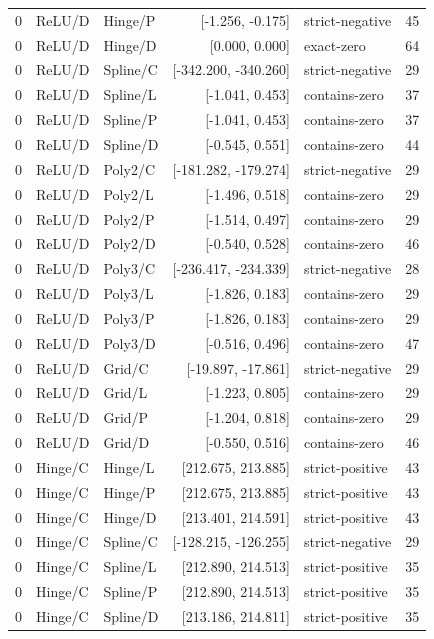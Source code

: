 \begin{longtable}{lllrlr}
0 & ReLU/D & Hinge/P & [-1.256, -0.175] & strict-negative & 45 \\
0 & ReLU/D & Hinge/D & [0.000, 0.000] & exact-zero & 64 \\
0 & ReLU/D & Spline/C & [-342.200, -340.260] & strict-negative & 29 \\
0 & ReLU/D & Spline/L & [-1.041, 0.453] & contains-zero & 37 \\
0 & ReLU/D & Spline/P & [-1.041, 0.453] & contains-zero & 37 \\
0 & ReLU/D & Spline/D & [-0.545, 0.551] & contains-zero & 44 \\
0 & ReLU/D & Poly2/C & [-181.282, -179.274] & strict-negative & 29 \\
0 & ReLU/D & Poly2/L & [-1.496, 0.518] & contains-zero & 29 \\
0 & ReLU/D & Poly2/P & [-1.514, 0.497] & contains-zero & 29 \\
0 & ReLU/D & Poly2/D & [-0.540, 0.528] & contains-zero & 46 \\
0 & ReLU/D & Poly3/C & [-236.417, -234.339] & strict-negative & 28 \\
0 & ReLU/D & Poly3/L & [-1.826, 0.183] & contains-zero & 29 \\
0 & ReLU/D & Poly3/P & [-1.826, 0.183] & contains-zero & 29 \\
0 & ReLU/D & Poly3/D & [-0.516, 0.496] & contains-zero & 47 \\
0 & ReLU/D & Grid/C & [-19.897, -17.861] & strict-negative & 29 \\
0 & ReLU/D & Grid/L & [-1.223, 0.805] & contains-zero & 29 \\
0 & ReLU/D & Grid/P & [-1.204, 0.818] & contains-zero & 29 \\
0 & ReLU/D & Grid/D & [-0.550, 0.516] & contains-zero & 46 \\
0 & Hinge/C & Hinge/L & [212.675, 213.885] & strict-positive & 43 \\
0 & Hinge/C & Hinge/P & [212.675, 213.885] & strict-positive & 43 \\
0 & Hinge/C & Hinge/D & [213.401, 214.591] & strict-positive & 43 \\
0 & Hinge/C & Spline/C & [-128.215, -126.255] & strict-negative & 29 \\
0 & Hinge/C & Spline/L & [212.890, 214.513] & strict-positive & 35 \\
0 & Hinge/C & Spline/P & [212.890, 214.513] & strict-positive & 35 \\
0 & Hinge/C & Spline/D & [213.186, 214.811] & strict-positive & 35 \\

\end{longtable}
